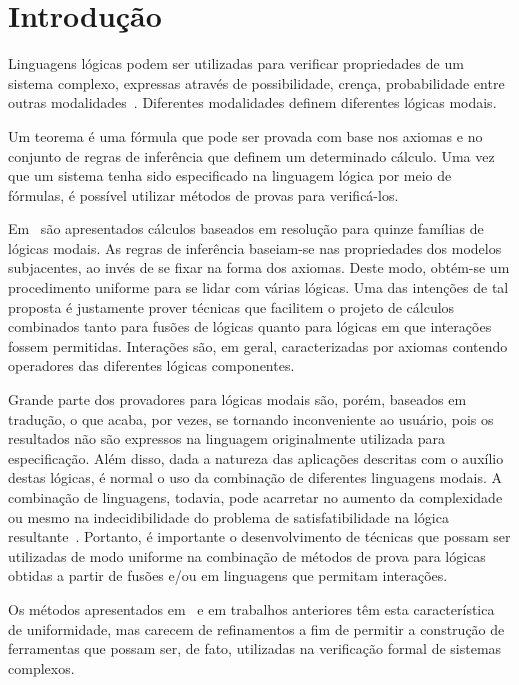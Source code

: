 \chapter{Introdução}
\label{cap:intro}

Linguagens lógicas podem ser utilizadas para verificar propriedades de um
sistema complexo, expressas através de possibilidade, crença, probabilidade
entre outras modalidades~\cite{FHMV95,rao:91c,HMM83,Hai82}. Diferentes
modalidades definem diferentes lógicas modais.

Um teorema é uma fórmula que pode ser provada com base nos axiomas e no conjunto
de regras de inferência que definem um determinado cálculo. Uma vez que um
sistema tenha sido especificado na linguagem lógica por meio de fórmulas, é
possível utilizar métodos de provas para verificá-los.

Em~\cite{nalon} são apresentados cálculos baseados em resolução para quinze
famílias de lógicas modais. As regras de inferência baseiam-se nas propriedades
dos modelos subjacentes, ao invés de se fixar na forma dos axiomas. Deste modo,
obtém-se um procedimento uniforme para se lidar com várias lógicas. Uma das
intenções de tal proposta é justamente prover técnicas que facilitem o projeto
de cálculos combinados tanto para fusões de lógicas quanto para lógicas em que
interações fossem permitidas. Interações são, em geral, caracterizadas por
axiomas contendo operadores das diferentes lógicas componentes.

Grande parte dos provadores para lógicas modais são, porém, baseados em
tradução, o que acaba, por vezes, se tornando inconveniente ao usuário, pois os
resultados não são expressos na linguagem originalmente utilizada para
especificação. Além disso, dada a natureza das aplicações descritas com o
auxílio destas lógicas, é normal o uso da combinação de diferentes linguagens
modais. A combinação de linguagens, todavia, pode acarretar no aumento da
complexidade ou mesmo na indecidibilidade do problema de satisfatibilidade na
lógica resultante~\cite{mdml}.
Portanto, é importante o desenvolvimento de técnicas que possam ser utilizadas
de modo uniforme na combinação de métodos de prova para lógicas obtidas a partir
de fusões e/ou em linguagens que permitam interações.

Os métodos apresentados em~\cite{nalon} e em trabalhos anteriores têm esta
característica de uniformidade, mas carecem de refinamentos a fim de permitir a
construção de ferramentas que possam ser, de fato, utilizadas na verificação
formal de sistemas complexos.

